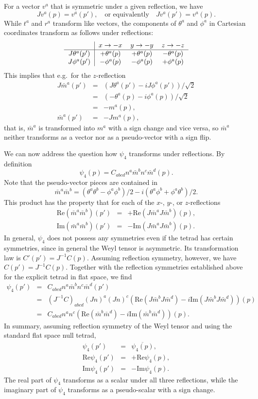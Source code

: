\documentclass[12pt]{article}
\newcommand{\beq}{\begin{equation}}
\newcommand{\eeq}{\end{equation}}
\newcommand{\bea}{\begin{eqnarray}}
\newcommand{\eea}{\end{eqnarray}}
\begin{document}
For a vector $v^a$ that is symmetric under a given reflection, we have
\beq
 Jv^a(p) = v^a(p'), \quad \mbox{or equivalently}\quad Jv^a(p') = v^a(p). 
\eeq
While $t^a$ and $r^a$ transform like vectors, the components of
$\theta^a$ and $\phi^a$ in Cartesian coordinates transform as follows
under reflections:
\beq
\begin{tabular}{c|ccc}
           & $x\rightarrow -x$ & $y\rightarrow -y$ & $z\rightarrow -z$
\\ \hline
$J\theta^a(p')$ & $+\theta^a(p)$ &   $+\theta^a(p)$ &  $ - \theta^a(p)$ 
\\
$J\phi^a(p')$ & $-\phi^a(p)$ &   $-\phi^a(p)$ &  $ + \phi^a(p)$ 
\end{tabular}
\eeq
This implies that e.g.\ for the $z$-reflection
\bea
        J\bar{m}^a(p') &=& 
                 (J\theta^a(p') - i J\phi^a(p'))/\sqrt{2}
\\
             &=& (-\theta^a(p) - i \phi^a(p))/\sqrt{2}
\\
                       &=& - m^a(p),
\\
        \bar{m}^a(p') &=& - Jm^a(p),
\eea
that is, $\bar{m}^a$ is transformed into $m^a$ with a sign change and
vice versa, so $\bar{m}^a$ neither transforms as a vector nor as a
pseudo-vector with a sign flip.

We can now address the question how $\psi_4$ transforms under
reflections. By definition
\beq
        \psi_4(p) = C_{abcd} n^a \bar{m}^b n^c \bar{m}^d (p).
\eeq
Note that the pseudo-vector pieces are contained in 
\beq
        \bar{m}^a \bar{m}^b = (\theta^a\theta^b - \phi^a\phi^b)/2
                             - i (\theta^a\phi^b + \phi^a\theta^b)/2.
\eeq
This product has the property that for each of the $x$-, $y$-, or
$z$-reflections 
\bea
  \mbox{Re}(\bar{m}^a\bar{m}^b)(p') &=& + \mbox{Re}(J\bar{m}^aJ\bar{m}^b)(p),
\\
  \mbox{Im}(\bar{m}^a\bar{m}^b)(p') &=& - \mbox{Im}(J\bar{m}^aJ\bar{m}^b)(p).
\eea
In general, $\psi_4$ does not possess any symmetries even if the tetrad
has certain symmetries, since in general the Weyl tensor is asymmetric. 
Its transformation law is $C'(p') = J^{-1} C(p)$. Assuming
reflection symmetry, however, we have $C(p') = J^{-1} C(p)$. Together
with the reflection symmetries established above for the explicit
tetrad in flat space, we find
\bea
        \psi_4(p') &=& C_{abcd} n^a \bar{m}^b n^c \bar{m}^d (p')
\\
        &=& (J^{-1}C)_{abcd} (J n)^a (J n)^c 
            (\mbox{Re}(J\bar{m}^bJ\bar{m}^d) - 
            i\mbox{Im}(J\bar{m}^bJ\bar{m}^d))(p)
\\
        &=& C_{abcd} n^a n^c 
            (\mbox{Re}(\bar{m}^b\bar{m}^d) 
          - i\mbox{Im}(\bar{m}^b\bar{m}^d))(p).
\eea
In summary, assuming reflection symmetry of the Weyl tensor and using
the standard flat space null tetrad,
\bea
        \psi_4(p') &=& \overline{\psi_4(p)},
\\
        \mbox{Re}\psi_4(p') &=& +\mbox{Re}\psi_4(p),
\\
        \mbox{Im}\psi_4(p') &=& -\mbox{Im}\psi_4(p).
\eea
The real part of $\psi_4$ transforms as a scalar under all
three reflections, while the imaginary part of $\psi_4$ transforms as
a pseudo-scalar with a sign change.
\end{document}
